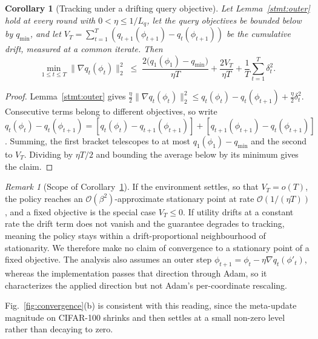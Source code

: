 \documentclass[journal]{IEEEtran}
\newtheorem{corollary}{Corollary}
\theoremstyle{remark}
\newtheorem{remark}{Remark}
\newcommand{\revtwo}[1]{#1}
\newcommand{\revtwoeq}{}
\begin{document}
{\begin{corollary}[\revtwo{Tracking under a drifting query objective}]\label{cor:rate}
\revtwo{Let Lemma~\ref{stmt:outer} hold at every round with $0<\eta\le 1/L_q$, let the query objectives be bounded below by $q_{\min}$, and let $V_T=\sum_{t=1}^{T}(q_{t+1}(\phi_{t+1})-q_t(\phi_{t+1}))$ be the cumulative drift, measured at a common iterate. Then}
\[
\revtwoeq \min_{1\le t\le T}\lVert\nabla q_t(\phi_t)\rVert_2^2\;\le\;
\frac{2\bigl(q_1(\phi_1)-q_{\min}\bigr)}{\eta T}+\frac{2V_T}{\eta T}+\frac{1}{T}\sum_{t=1}^{T}\delta_t^2 .
\]
\end{corollary}
\begin{proof}
\revtwo{Lemma~\ref{stmt:outer} gives $\tfrac{\eta}{2}\lVert\nabla q_t(\phi_t)\rVert_2^2\le q_t(\phi_t)-q_t(\phi_{t+1})+\tfrac{\eta}{2}\delta_t^2$. Consecutive terms belong to different objectives, so write $q_t(\phi_t)-q_t(\phi_{t+1})=[q_t(\phi_t)-q_{t+1}(\phi_{t+1})]+[q_{t+1}(\phi_{t+1})-q_t(\phi_{t+1})]$. Summing, the first bracket telescopes to at most $q_1(\phi_1)-q_{\min}$ and the second to $V_T$. Dividing by $\eta T/2$ and bounding the average below by its minimum gives the claim.}
\end{proof}

\begin{remark}[\revtwo{Scope of Corollary~\ref{cor:rate}}]\label{rem:reading}
\revtwo{If the environment settles, so that $V_T=o(T)$, the policy reaches an $\mathcal{O}(\beta^2)$-approximate stationary point at rate $\mathcal{O}(1/(\eta T))$, and a fixed objective is the special case $V_T\le 0$. If utility drifts at a constant rate the drift term does not vanish and the guarantee degrades to tracking, meaning the policy stays within a drift-proportional neighbourhood of stationarity. We therefore make no claim of convergence to a stationary point of a fixed objective. The analysis also assumes an outer step $\phi_{t+1}=\phi_t-\eta\nabla q_t(\phi'_t)$, whereas the implementation passes that direction through Adam, so it characterizes the applied direction but not Adam's per-coordinate rescaling.}
\end{remark}
\color{black}
\revtwo{Fig.~\ref{fig:convergence}(b) is consistent with this reading, since the meta-update magnitude on CIFAR-100 shrinks and then settles at a small non-zero level rather than decaying to zero.}
}
\end{document}
